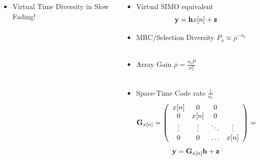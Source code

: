 \documentclass[xcolor=dvipsnames,aspectratio=169]{beamer}
\begin{document}
{\begin{columns}
\begin{column}{5cm}
  \begin{itemize}
   \item Virtual Time Diversity in Slow Fading!
  \end{itemize}
 \end{column}
 \begin{column}{7cm}
  \begin{itemize}
   \item Virtual SIMO equivalent
   $$\mathbf{y}
=\mathbf{h} x[n]+\mathbf{z} $$
   \item MRC/Selection Diversity $P_o\approx \overline{\rho}^{-n_t}$\\ \ \\
   \item Array Gain $\overline{\rho}=\frac{n_tP}{\sigma_z^2}$\\ \ \\
   \item Space-Time Code rate $\frac{1}{n_t}$
   $$\mathbf{G}_{x[n]}=\left(\begin{array}{cccc}
            x[n]&0&0\\
            0&x[n]&0\\
            \vdots&\vdots&\ddots&\vdots\\
            0&0&\dots&x[n]\\
\end{array}\right)=\mathbf{I}_{n_t}x[n]$$
   $$\mathbf{y}=\mathbf{G}_{x[n]}\mathbf{h}+\mathbf{z}$$
  \end{itemize}
 \end{column}
\end{columns}
}
\end{document}
